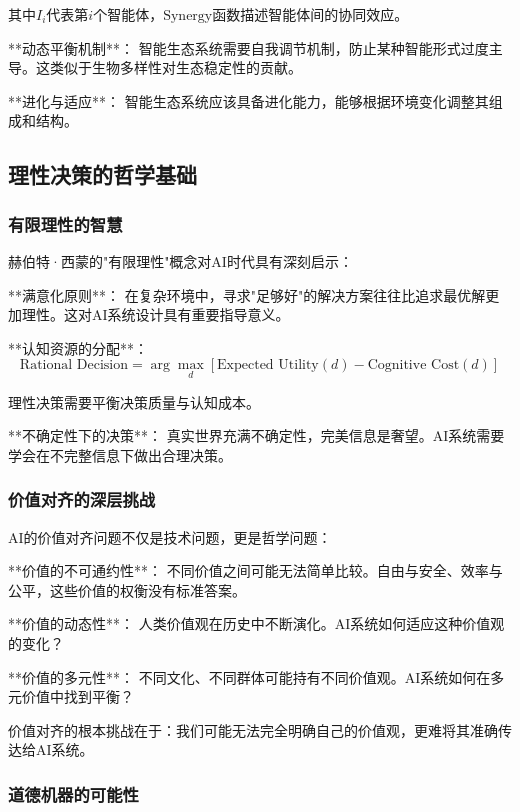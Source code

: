 其中$I_i$代表第$i$个智能体，$\text{Synergy}$函数描述智能体间的协同效应。

**动态平衡机制**：
智能生态系统需要自我调节机制，防止某种智能形式过度主导。这类似于生物多样性对生态稳定性的贡献。

**进化与适应**：
智能生态系统应该具备进化能力，能够根据环境变化调整其组成和结构。

\subsection{理性决策的哲学基础} %

\subsubsection{有限理性的智慧}

赫伯特·西蒙的"有限理性"概念对AI时代具有深刻启示：

**满意化原则**：
在复杂环境中，寻求"足够好"的解决方案往往比追求最优解更加理性。这对AI系统设计具有重要指导意义。

**认知资源的分配**：
\begin{equation}
\text{Rational Decision} = \arg\max_{d} \left[ \text{Expected Utility}(d) - \text{Cognitive Cost}(d) \right]
\end{equation}

理性决策需要平衡决策质量与认知成本。

**不确定性下的决策**：
真实世界充满不确定性，完美信息是奢望。AI系统需要学会在不完整信息下做出合理决策。

\subsubsection{价值对齐的深层挑战}

AI的价值对齐问题不仅是技术问题，更是哲学问题：

**价值的不可通约性**：
不同价值之间可能无法简单比较。自由与安全、效率与公平，这些价值的权衡没有标准答案。

**价值的动态性**：
人类价值观在历史中不断演化。AI系统如何适应这种价值观的变化？

**价值的多元性**：
不同文化、不同群体可能持有不同价值观。AI系统如何在多元价值中找到平衡？

\begin{center}
价值对齐的根本挑战在于：我们可能无法完全明确自己的价值观，更难将其准确传达给AI系统。
\end{center}

\subsubsection{道德机器的可能性}

